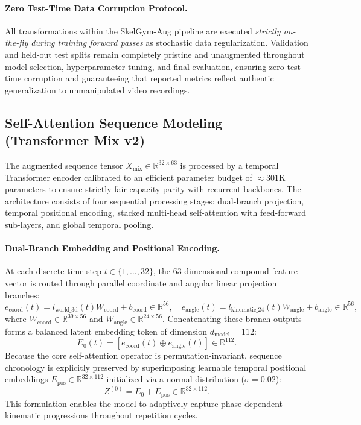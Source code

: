 \documentclass[runningheads]{llncs}
\begin{document}
\paragraph{Zero Test-Time Data Corruption Protocol.}
All transformations within the SkelGym-Aug pipeline are executed \textit{strictly on-the-fly during training forward passes} as stochastic data regularization. Validation and held-out test splits remain completely pristine and unaugmented throughout model selection, hyperparameter tuning, and final evaluation, ensuring zero test-time corruption and guaranteeing that reported metrics reflect authentic generalization to unmanipulated video recordings.

\subsection{Self-Attention Sequence Modeling (Transformer Mix v2)}
The augmented sequence tensor $X_{\text{mix}} \in \mathbb{R}^{32 \times 63}$ is processed by a temporal Transformer encoder \cite{vaswani2017} calibrated to an efficient parameter budget of $\approx 301\text{K}$ parameters to ensure strictly fair capacity parity with recurrent backbones. The architecture consists of four sequential processing stages: dual-branch projection, temporal positional encoding, stacked multi-head self-attention with feed-forward sub-layers, and global temporal pooling.

\paragraph{Dual-Branch Embedding and Positional Encoding.} At each discrete time step $t \in \{1, \dots, 32\}$, the 63-dimensional compound feature vector is routed through parallel coordinate and angular linear projection branches:
\begin{equation}
    e_{\text{coord}}(t) = l_{\text{world\_3d}}(t) W_{\text{coord}} + b_{\text{coord}} \in \mathbb{R}^{56}, \quad e_{\text{angle}}(t) = l_{\text{kinematic\_24}}(t) W_{\text{angle}} + b_{\text{angle}} \in \mathbb{R}^{56},
\end{equation}
where $W_{\text{coord}} \in \mathbb{R}^{39 \times 56}$ and $W_{\text{angle}} \in \mathbb{R}^{24 \times 56}$. Concatenating these branch outputs forms a balanced latent embedding token of dimension $d_{\text{model}} = 112$:
\begin{equation}
    E_0(t) = \left[ e_{\text{coord}}(t) \oplus e_{\text{angle}}(t) \right] \in \mathbb{R}^{112}.
\end{equation}
Because the core self-attention operator is permutation-invariant, sequence chronology is explicitly preserved by superimposing learnable temporal positional embeddings $E_{\text{pos}} \in \mathbb{R}^{32 \times 112}$ initialized via a normal distribution ($\sigma = 0.02$):
\begin{equation}
    Z^{(0)} = E_0 + E_{\text{pos}} \in \mathbb{R}^{32 \times 112}.
\end{equation}
This formulation enables the model to adaptively capture phase-dependent kinematic progressions throughout repetition cycles.
\end{document}
